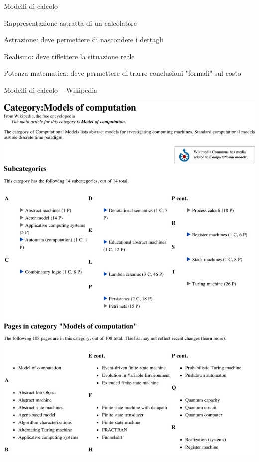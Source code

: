 \begin{frame}{Modelli di calcolo}
\begin{myboxtitle}
Rappresentazione astratta di un calcolatore
\BI
\item \alert{Astrazione}: deve permettere di nascondere i dettagli
\item \alert{Realismo}: deve riflettere la situazione reale
\item \alert{Potenza matematica}: deve permettere di trarre conclusioni "formali" sul costo
\EI
\end{myboxtitle}
\end{frame}


\begin{frame}{Modelli di calcolo -- Wikipedia}

\includegraphics[width=\textwidth]{models.pdf}

\end{frame}


